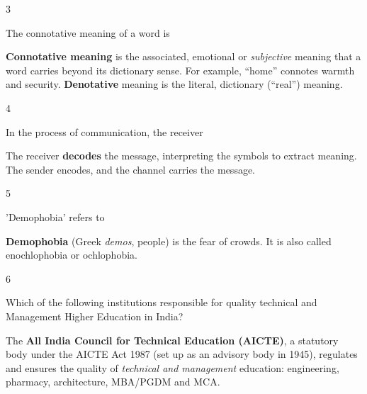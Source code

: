 \begin{question}{3}
{The connotative meaning of a word is\par}
\begin{explain}
\textbf{Connotative meaning} is the associated, emotional or \emph{subjective} meaning that a word carries beyond its dictionary sense. For example, ``home'' connotes warmth and security. \textbf{Denotative} meaning is the literal, dictionary (``real'') meaning.
\end{explain}
\end{question}

\begin{question}{4}
{In the process of communication, the receiver\par}
\begin{explain}
The receiver \textbf{decodes} the message, interpreting the symbols to extract meaning. The sender encodes, and the channel carries the message.
\end{explain}
\end{question}

\begin{question}{5}
{'Demophobia' refers to\par}
\begin{explain}
\textbf{Demophobia} (Greek \emph{demos}, people) is the fear of crowds. It is also called enochlophobia or ochlophobia.
\end{explain}
\end{question}

\begin{question}{6}
{Which of the following institutions responsible for quality technical and Management Higher Education in India?\par}
\begin{explain}
The \textbf{All India Council for Technical Education (AICTE)}, a statutory body under the AICTE Act 1987 (set up as an advisory body in 1945), regulates and ensures the quality of \emph{technical and management} education: engineering, pharmacy, architecture, MBA/PGDM and MCA.
\end{explain}
\end{question}

